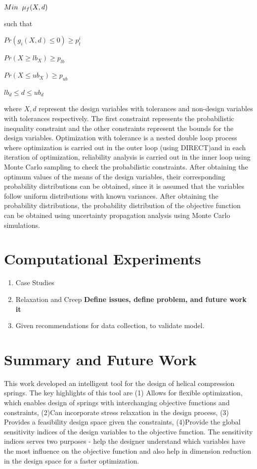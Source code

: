 \documentclass[11pt]{article}
\begin{document}
\centerline{$Min \hspace{2mm} \mu_{f} (X,d)$}

such that

\centerline{$Pr(g_{i}(X,d) \leq 0)\geq p_{t}^{i}$}
\centerline{$Pr(X \geq lb_{X})\geq p_{lb}$}
\centerline{$Pr(X \leq ub_{X})\geq p_{ub}$}
\centerline{$lb_{d} \leq d \leq ub_{d}$}

\noindent where $X,d$ represent the design variables with tolerances and non-design variables with tolerances respectively. The first constraint represents the probabilistic inequality constraint and the other constraints represent the bounds for the design variables. Optimization with tolerance is a nested double loop process where optimization is carried out in the outer loop (using DIRECT)and in each iteration of optimization, reliability analysis is carried out in the inner loop using Monte Carlo sampling to check the probabilistic constraints. After obtaining the optimum values of the means of the design variables, their corresponding probability distributions can be obtained, since it is assumed that the variables follow uniform distributions with known variances. After obtaining the probability distributions, the probability distribution of the objective function can be obtained using uncertainty propagation analysis using Monte Carlo simulations.



		 
\section{Computational Experiments}
	\begin{enumerate}

		\item Case Studies
		
		\item Relaxation and Creep \textbf{Define issues, define problem, and future work it}
		
		\item Given recommendations for data collection, to validate model.
		
	\end{enumerate}
	
	
		
\section{Summary and Future Work}
\hspace{5 mm} This work developed an intelligent tool  for the design of helical compression springs. The key highlights of this tool are (1) Allows for flexible optimization, which enables design of springs with interchanging objective functions and constraints, (2)Can incorporate stress relaxation in the design process, (3) Provides a feasibility design space given the constraints, (4)Provide the global sensitivity indices of the design variables to the objective function. The sensitivity indices serves two purposes - help the designer understand which variables have the most influence on the objective function and also help in dimension reduction in the design space for a faster optimization.
\end{document}
